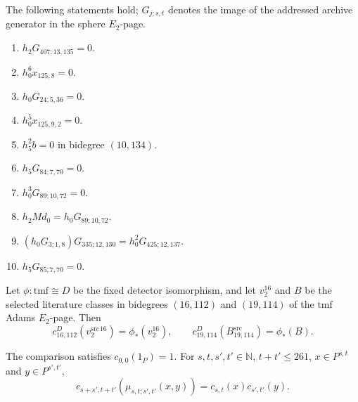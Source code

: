 \begin{theorem}
\label{frontier:E2Computation:f5588f00ea38}
The following statements hold; $G_{j;s,t}$ denotes the image of the addressed archive generator in the sphere $E_2$-page.
\begin{enumerate}
\item $h_2G_{407;13,135}=0$.
\item $h_0^6x_{125,8}=0$.
\item $h_0G_{24;5,36}=0$.
\item $h_0^5x_{125,9,2}=0$.
\item $h_5^2b=0$ in bidegree $(10,134)$.
\item $h_5G_{84;7,70}=0$.
\item $h_0^3G_{89;10,72}=0$.
\item $h_2Md_0=h_0G_{89;10,72}$.
\item $(h_0G_{3;1,8})G_{335;12,130}=h_0^2G_{425;12,137}$.
\item $h_5G_{85;7,70}=0$.
\end{enumerate}
\end{theorem}

\begin{theorem}
\label{frontier:E2Computation:07bf2180c6a5}
Let $\phi:\mathrm{tmf}\cong D$ be the fixed detector isomorphism, and let $v_2^{16}$ and $B$ be the selected literature classes in bidegrees $(16,112)$ and $(19,114)$ of the $\mathrm{tmf}$ Adams $E_2$-page. Then
\[c^D_{16,112}(v^{\mathrm{src}}_2{}^{16})=\phi_*(v_2^{16}),\qquad c^D_{19,114}(B^{\mathrm{src}}_{19,114})=\phi_*(B).\]
\end{theorem}

\begin{theorem}
\label{frontier:E2Computation:07da9aeedae4}
The comparison satisfies $c_{0,0}(1_P)=1$. For $s,t,s',t'\in\mathbb N$, $t+t'\leq261$, $x\in P^{s,t}$ and $y\in P^{s',t'}$,
\[c_{s+s',t+t'}(\mu_{s,t;s',t'}(x,y))=c_{s,t}(x)c_{s',t'}(y).\]
\end{theorem}

